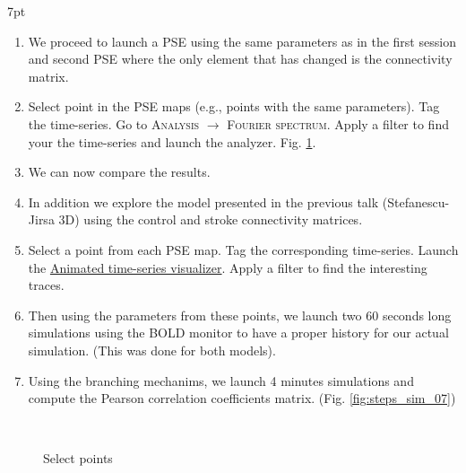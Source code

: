 \documentclass{tufte-handout}
\newenvironment{simulation}{%
  \def\FrameCommand{%
    \hspace{1pt}%
    {\color{ForestGreen}\vrule width 2pt}%
    {\color{simulationshade}\vrule width 4pt}%
    \colorbox{simulationshade}%
  }%
  \MakeFramed{\advance\hsize-\width\FrameRestore}%
  \noindent\hspace{-4.55pt}%
  \begin{adjustwidth}{}{7pt}%
  \vspace{2pt}\vspace{2pt}%
}
{%
  \vspace{2pt}\end{adjustwidth}\endMakeFramed%
}
\begin{document}
\begin{simulation}
  \begin{enumerate}
  \item We proceed to launch a PSE using the same parameters as in the first session and second PSE where
the only element that has changed is the connectivity matrix.

  \item Select point in the PSE maps (e.g., points with the same parameters). Tag the time-series. Go to \textsc{Analysis} $\rightarrow$ \textsc{Fourier spectrum}. Apply a filter to find your the time-series and launch the analyzer. Fig. \ref{fig:steps_sim_03}.

  \item We can now compare the results.

  \item In addition we explore the model presented in the previous talk (Stefanescu-Jirsa 3D) using the control and stroke connectivity matrices. 
  \item Select a point from each PSE map. Tag the corresponding time-series. Launch the \underline{Animated time-series visualizer}. Apply a filter to find the interesting traces. 

  \item Then using the parameters from these points, we launch two 60 seconds long simulations using the BOLD monitor to have a proper history for our actual simulation. (This was done for both models). 

  \item Using the branching mechanims, we launch 4 minutes simulations and compute the Pearson correlation coefficients matrix. (Fig. \ref{fig:steps_sim_07}) 

  \end{enumerate}
\end{simulation}


\begin{figure}%
  \\
  \caption{Select points}
  \label{fig:steps_sim_03}
\end{figure}
\end{document}
